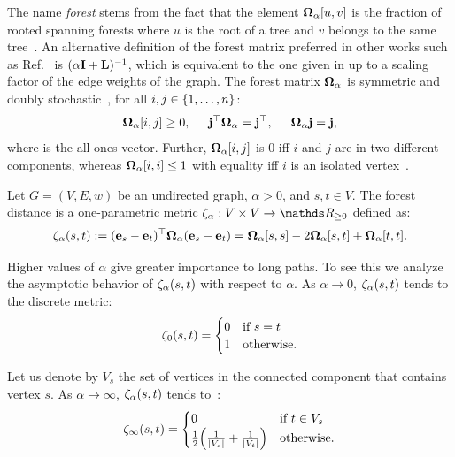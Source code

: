The name \emph{forest} stems from the fact that
the element $\bm{\Omega}_{\alpha}[u, v]$ is the fraction of rooted spanning forests
where $u$ is the root of a tree and $v$ belongs to the same
tree~\cite{chebotarev2000forest,DBLP:conf/icdm/JinBZ19}.
%
An alternative definition of the forest matrix preferred in other
works such as Ref.~\cite{DBLP:journals/corr/abs-math-0602073} is $(\alpha\mathbf{I} +
\mathbf{L})^{-1}$, which is equivalent to the one given in 
up to a scaling factor of the edge weights of the graph.
%
The forest matrix $\bm{\Omega}_{\alpha}$ is symmetric and doubly
stochastic~\cite{merris1997doubly}, \ie for all $i,j\in\set{1,\ldots,n}$:
%
\[
\bm{\Omega}_{\alpha}[i, j] \ge 0,\hspace{5mm}\mathbf{j}^\top\bm{\Omega}_{\alpha} = \mathbf{j}^\top,\hspace{5mm}\bm{\Omega}_{\alpha}\mathbf{j} = \mathbf{j},
\]
%
where \ones is the all-ones vector. Further, $\bm{\Omega}_{\alpha}[i,j]$ is $0$ iff $i$ and
$j$ are in two different components, whereas $\bm{\Omega}_{\alpha}[i,i] \le 1$ with equality
iff $i$ is an isolated vertex~\cite{merris1998doubly}.

\begin{definition}
\label{def:forest-distance}
Let $G = (V, E, w)$ be an undirected graph, $\alpha > 0$, and $s,t\in V$. The
forest distance is a one-parametric metric $\fdistp : V \times V \to \real_{\ge 0}$
defined as:
%
\[
\zeta_{\alpha}(s, t) := (\mathbf{e}_{s} - \mathbf{e}_{t})^\top \bm{\Omega}_{\alpha} (\mathbf{e}_{s} - \mathbf{e}_{t}) =
\bm{\Omega}_{\alpha}[s,s] - 2\bm{\Omega}_{\alpha}[s,t] + \bm{\Omega}_{\alpha}[t,t].
\]
\end{definition}

Higher values of $\alpha$ give greater importance to long paths. To see this we
analyze the asymptotic behavior of $\zeta_{\alpha}(s, t)$ with respect to $\alpha$. As
$\alpha \to 0$, $\zeta_{\alpha}(s, t)$ tends to the discrete metric:
%
\[
\zeta_0(s, t) =
\begin{cases}
0 &\text{if}\ s = t\\
1 &\text{otherwise}.
\end{cases}
\]

Let us denote by $V_s$ the set of vertices in the connected component that contains
vertex $s$. As $\alpha \to \infty$, $\zeta_{\alpha}(s, t)$ tends
to~\cite{chebotarev2000forest}:
%
\[
\fdist_{\infty}(s, t) =
\begin{cases}
0 & \text{if}\ t \in V_s\\
\frac 12 \roundb{\frac{1}{|V_s|} + \frac{1}{|V_t|}} & \text{otherwise}.
\end{cases}
\]

%
